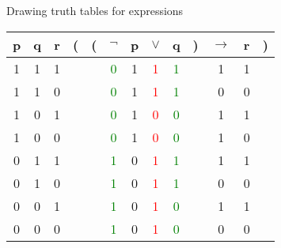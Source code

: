 \documentclass[
  ignorenonframetext,
]{beamer}
\begin{document}
\begin{frame}{Drawing truth tables for expressions}
\protect\hypertarget{drawing-truth-tables-for-expressions-2}{}

\begin{tabular}{@{ }c@{ }@{ }c@{ }@{ }c | c@{}@{}c@{}@{ }c@{ }@{ }c@{ }@{ }c@{ }@{ }c@{ }@{}c@{}@{ }c@{ }@{ }c@{ }@{}c@{ }}
p & q & r & ( & ( & $\neg$ & p & $\vee$ & q & ) & $\rightarrow$ & r & )\\
\hline 
1 & 1 & 1 &  &  & \textcolor{green}{0} & 1 & \textcolor{red}{1} & \textcolor{green}{1} &  & 1 & 1 & \\
1 & 1 & 0 &  &  & \textcolor{green}{0} & 1 & \textcolor{red}{1} & \textcolor{green}{1} &  & 0 & 0 & \\
1 & 0 & 1 &  &  & \textcolor{green}{0} & 1 & \textcolor{red}{0} & \textcolor{green}{0} &  & 1 & 1 & \\
1 & 0 & 0 &  &  & \textcolor{green}{0} & 1 & \textcolor{red}{0} & \textcolor{green}{0} &  & 1 & 0 & \\
0 & 1 & 1 &  &  & \textcolor{green}{1} & 0 & \textcolor{red}{1} & \textcolor{green}{1} &  & 1 & 1 & \\
0 & 1 & 0 &  &  & \textcolor{green}{1} & 0 & \textcolor{red}{1} & \textcolor{green}{1} &  & 0 & 0 & \\
0 & 0 & 1 &  &  & \textcolor{green}{1} & 0 & \textcolor{red}{1} & \textcolor{green}{0} &  & 1 & 1 & \\
0 & 0 & 0 &  &  & \textcolor{green}{1} & 0 & \textcolor{red}{1} & \textcolor{green}{0} &  & 0 & 0 & \\
\end{tabular}

\end{frame}
\end{document}
